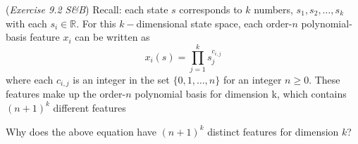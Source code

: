 (\textit{Exercise 9.2 S\&B})
Recall: each state $s$ corresponds to $k$ numbers, $s_{1}, s_{2}, \dotso , s_{k}$ with each $s_{i} \in \mathbb{R}$. For this $k-$dimensional state space, each order-$n$ polynomial-basis feature $x_{i}$ can be written as
$$x_{i}(s) = \prod_{j=1}^{k} s^{c_{i,j}}_{j}$$
where each $c_{i,j}$ is an integer in the set $\{0,1,\dotso, n\}$ for an integer $n \geq 0$. These features make up the order-$n$ polynomial basis for dimension k, which contains $(n+1)^{k}$ different features


Why does the above equation have $(n + 1)^{k}$ distinct features for dimension $k$?